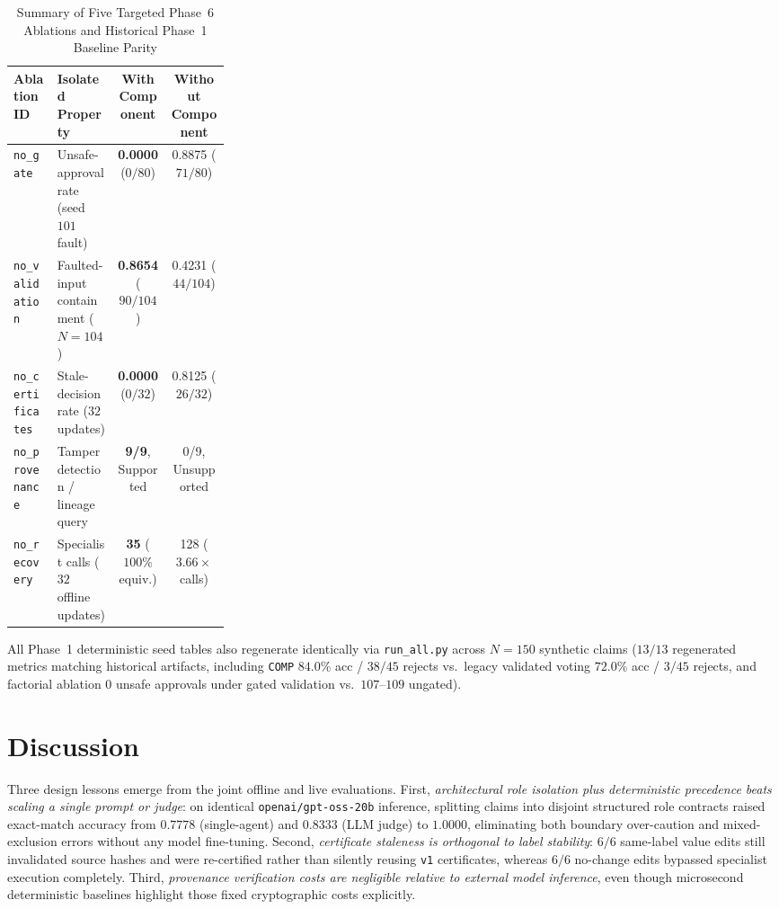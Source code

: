 \documentclass[11pt,a4paper]{article}
\begin{document}
\begin{table}[t]
\centering
\caption{Summary of Five Targeted Phase~6 Ablations and Historical Phase~1 Baseline Parity}
\label{tab:ablations}
\small
\begin{tabular}{@{}lp{0.28\linewidth}cc@{}}
\toprule
\textbf{Ablation ID} & \textbf{Isolated Property} & \textbf{With Component} & \textbf{Without Component} \\
\midrule
\texttt{no\_gate} & Unsafe-approval rate (seed $101$ fault) & \textbf{0.0000} ($0/80$) & 0.8875 ($71/80$) \\
\texttt{no\_validation} & Faulted-input containment ($N=104$) & \textbf{0.8654} ($90/104$) & 0.4231 ($44/104$) \\
\texttt{no\_certificates} & Stale-decision rate ($32$ updates) & \textbf{0.0000} ($0/32$) & 0.8125 ($26/32$) \\
\texttt{no\_provenance} & Tamper detection / lineage query & \textbf{9/9}, Supported & 0/9, Unsupported \\
\texttt{no\_recovery} & Specialist calls ($32$ offline updates) & \textbf{35} ($100\%$ equiv.) & 128 ($3.66\times$ calls) \\
\bottomrule
\end{tabular}
\end{table}

All Phase~1 deterministic seed tables also regenerate identically via \texttt{run\_all.py} across $N=150$ synthetic claims ($13/13$ regenerated metrics matching historical artifacts, including \texttt{COMP} $84.0\%$ acc / $38/45$ rejects vs.\ legacy validated voting $72.0\%$ acc / $3/45$ rejects, and factorial ablation $0$ unsafe approvals under gated validation vs.\ $107$--$109$ ungated).

\section{Discussion}
Three design lessons emerge from the joint offline and live evaluations. First, \emph{architectural role isolation plus deterministic precedence beats scaling a single prompt or judge}: on identical \texttt{openai/gpt-oss-20b} inference, splitting claims into disjoint structured role contracts raised exact-match accuracy from $0.7778$ (single-agent) and $0.8333$ (LLM judge) to $1.0000$, eliminating both boundary over-caution and mixed-exclusion errors without any model fine-tuning. Second, \emph{certificate staleness is orthogonal to label stability}: $6/6$ same-label value edits still invalidated source hashes and were re-certified rather than silently reusing \texttt{v1} certificates, whereas $6/6$ no-change edits bypassed specialist execution completely. Third, \emph{provenance verification costs are negligible relative to external model inference}, even though microsecond deterministic baselines highlight those fixed cryptographic costs explicitly.
\end{document}
